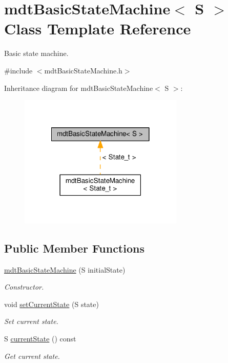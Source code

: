 \hypertarget{classmdt_basic_state_machine}{\section{mdt\-Basic\-State\-Machine$<$ S $>$ Class Template Reference}
\label{classmdt_basic_state_machine}
}


Basic state machine.  




{\ttfamily \#include $<$mdt\-Basic\-State\-Machine.\-h$>$}



Inheritance diagram for mdt\-Basic\-State\-Machine$<$ S $>$\-:\nopagebreak
\begin{figure}[H]
\begin{center}
\leavevmode
\includegraphics[width=222pt]{classmdt_basic_state_machine__inherit__graph}
\end{center}
\end{figure}
\subsection*{Public Member Functions}
\begin{DoxyCompactItemize}
\item 
\hyperlink{classmdt_basic_state_machine_a6b6261f9f6f602e62fed8481e7d176b9}{mdt\-Basic\-State\-Machine} (S initial\-State)
\begin{DoxyCompactList}\small\item\em Constructor. \end{DoxyCompactList}\item 
void \hyperlink{classmdt_basic_state_machine_ada54fcad4ecd0b03ab5a8d7dd9e4bb88}{set\-Current\-State} (S state)
\begin{DoxyCompactList}\small\item\em Set current state. \end{DoxyCompactList}\item 
S \hyperlink{classmdt_basic_state_machine_a812e5278badf8eb764473122e85a6a3e}{current\-State} () const 
\begin{DoxyCompactList}\small\item\em Get current state. \end{DoxyCompactList}\end{DoxyCompactItemize}



